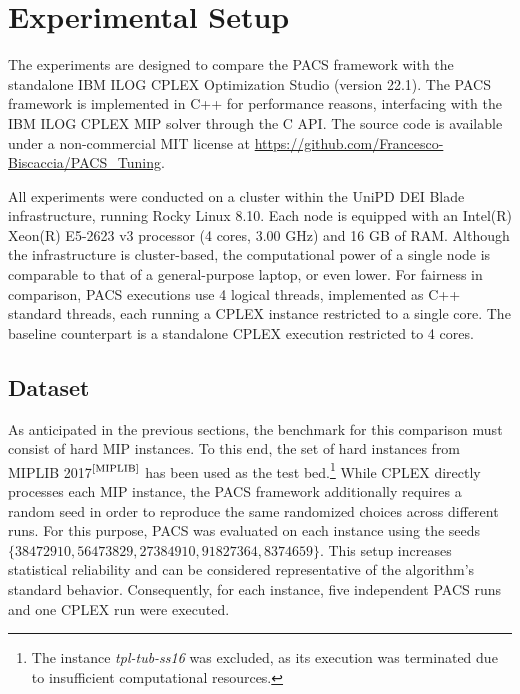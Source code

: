 \section{Experimental Setup}
The experiments are designed to compare the PACS framework with the standalone IBM ILOG CPLEX Optimization Studio (version 22.1).  
The PACS framework is implemented in C++ for performance reasons, interfacing with the IBM ILOG CPLEX MIP solver through the C API. The source code is available under a non-commercial MIT license at \url{https://github.com/Francesco-Biscaccia/PACS_Tuning}. 

All experiments were conducted on a cluster within the UniPD DEI Blade infrastructure, running Rocky Linux 8.10. Each node is equipped with an Intel(R) Xeon(R) E5-2623 v3 processor (4 cores, 3.00 GHz) and 16 GB of RAM. Although the infrastructure is cluster-based, the computational power of a single node is comparable to that of a general-purpose laptop, or even lower.  
For fairness in comparison, PACS executions use 4 logical threads, implemented as C++ standard threads, each running a CPLEX instance restricted to a single core. The baseline counterpart is a standalone CPLEX execution restricted to 4 cores.

\subsection{Dataset}
As anticipated in the previous sections, the benchmark for this comparison must consist of hard MIP instances. To this end, the set of hard instances from MIPLIB 2017$^\text{\cite{MIPLIB}}$ has been used as the test bed.\footnote{The instance \textit{tpl-tub-ss16} was excluded, as its execution was terminated due to insufficient computational resources.}  
While CPLEX directly processes each MIP instance, the PACS framework additionally requires a random seed in order to reproduce the same randomized choices across different runs. For this purpose, PACS was evaluated on each instance using the seeds $\{38472910, 56473829, 27384910, 91827364, 8374659\}$. This setup increases statistical reliability and can be considered representative of the algorithm’s standard behavior.  
Consequently, for each instance, five independent PACS runs and one CPLEX run were executed.

